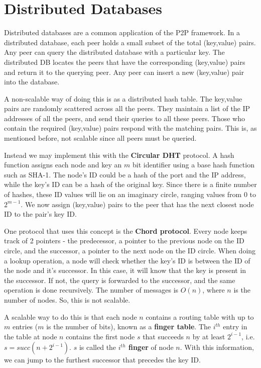\documentclass[12pt,letterpaper]{book}
\theoremstyle{definition}
\begin{document}
\section{Distributed Databases}

Distributed databases are a common application of the P2P framework. In a distributed database, each peer holds a small subset of the total (key,value) pairs. Any peer can query the distributed database with a particular key. The distributed DB locates the peers that have the corresponding (key,value) pairs and return it to the querying peer. Any peer can insert a new (key,value) pair into the database.

A non-scalable way of doing this is as a distributed hash table. The key,value pairs are randomly scattered across all the peers. They maintain a list of the IP addresses of all the peers, and send their queries to all these peers. Those who contain the required (key,value) pairs respond with the matching pairs. This is, as mentioned before, not scalable since all peers must be queried.

Instead we may implement this with the \textbf{Circular DHT}  protocol. A hash function assigns each node and key an $m$ bit identifier using a base hash function such as SHA-1. The node's ID could be a hash of the port and the IP address, while the key's ID can be a hash of the original key. Since there is a finite number of hashes, these ID values will lie on an imaginary circle, ranging values from $0$ to $2^{m-1}$. We now assign (key,value) pairs to the peer that has the next closest node ID to the pair's key ID.

One protocol that uses this concept is the \textbf{Chord protocol}. Every node keeps track of 2 pointers - the predecessor, a pointer to the previous node on the ID circle, and the successor, a pointer to the next node on the ID circle. When doing a lookup operation, a node will check whether the key's ID is between the ID of the node and it's successor. In this case, it will know that the key is present in the successor. If not, the query is forwarded to the successor, and the same operation is done recursively. The number of messages is $O(n)$, where $n$ is the number of nodes. So, this is not scalable.

A scalable way to do this is that each node $n$ contains a routing table with up to $m$ entries ($m$ is the number of bits), known as a \textbf{finger table}. The $i^{th}$ entry in the table at node $n$ contains the first node $s$ that succeeds $n$ by at least $2^{i-1}$, i.e. $s = succ(n+2^{i-1})$. $s$ is called the \textbf{ $i^{th}$ finger} of node $n$. With this information, we can jump to the furthest successor that precedes the key ID.
\end{document}
